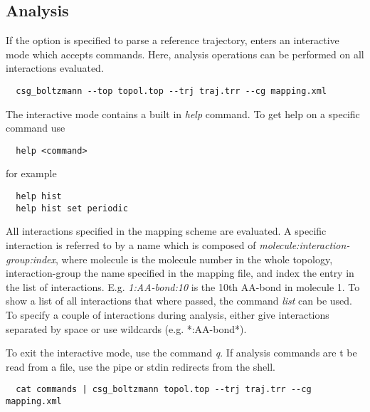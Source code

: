 \subsection{Analysis}
If the  option is specified to parse a reference trajectory,  enters an interactive mode which accepts commands. Here, analysis operations can be performed on all interactions evaluated.

\begin{verbatim}
  csg_boltzmann --top topol.top --trj traj.trr --cg mapping.xml 
\end{verbatim}

The interactive mode contains a built in \textit{help} command. To get help on a specific command use
\begin{verbatim}
  help <command>
\end{verbatim}
for example
\begin{verbatim}
  help hist
  help hist set periodic
\end{verbatim}

All interactions specified in the mapping scheme are evaluated. A specific interaction is referred to by a name which is composed of \textit{molecule:interaction-group:index}, where molecule is the molecule number in the whole topology, interaction-group the name specified in the mapping file, and index the entry in the list of interactions. E.g. \textit{1:AA-bond:10} is the 10th AA-bond in molecule 1. To show a list of all interactions that where passed, the command \textit{list} can be used. To specify a couple of interactions during analysis, either give interactions separated by space or use wildcards (e.g. *:AA-bond*).

To exit the interactive mode, use the command \textit{q}. If analysis commands are t be read from a file, use the pipe or stdin redirects from the shell.
\begin{verbatim}
  cat commands | csg_boltzmann topol.top --trj traj.trr --cg mapping.xml
\end{verbatim}

